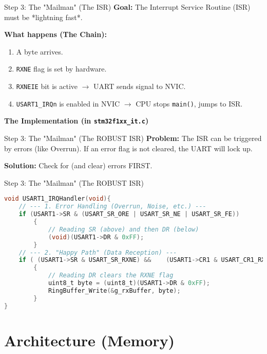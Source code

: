 \documentclass{beamer}
\begin{document}
\begin{frame}{Step 3: The "Mailman" (The ISR)}
	\textbf{Goal:} The Interrupt Service Routine (ISR) must be *lightning fast*.
	
	\textbf{What happens (The Chain):}
	\begin{enumerate}
		\item A byte arrives.
		\item \texttt{RXNE} flag is set by hardware.
		\item \texttt{RXNEIE} bit is active $\rightarrow$ UART sends signal to NVIC.
		\item \texttt{USART1\_IRQn} is enabled in NVIC $\rightarrow$ CPU stops \texttt{main()}, jumps to ISR.
	\end{enumerate}
	
	\textbf{The Implementation (in \texttt{stm32f1xx\_it.c})}
\end{frame}

\begin{frame}{Step 3: The "Mailman" (The ROBUST ISR)}
	\textbf{Problem:} The ISR can be triggered by errors (like Overrun).
	If an error flag is not cleared, the UART will lock up.
	
	\textbf{Solution:} Check for (and clear) errors FIRST.
\end{frame}
\begin{frame}[fragile]{Step 3: The "Mailman" (The ROBUST ISR)}
	\begin{lstlisting}[language=C, style=mystyle]
void USART1_IRQHandler(void){
	// --- 1. Error Handling (Overrun, Noise, etc.) ---
	if (USART1->SR & (USART_SR_ORE | USART_SR_NE | USART_SR_FE))
		{
			// Reading SR (above) and then DR (below)
			(void)(USART1->DR & 0xFF); 
		}
	// --- 2. "Happy Path" (Data Reception) ---
	if ( (USART1->SR & USART_SR_RXNE) && 	(USART1->CR1 & USART_CR1_RXNEIE) )
		{
			// Reading DR clears the RXNE flag
			uint8_t byte = (uint8_t)(USART1->DR & 0xFF);	
			RingBuffer_Write(&g_rxBuffer, byte);
		}
}
\end{lstlisting}
\end{frame}

\section{Architecture (Memory)}
\end{document}
